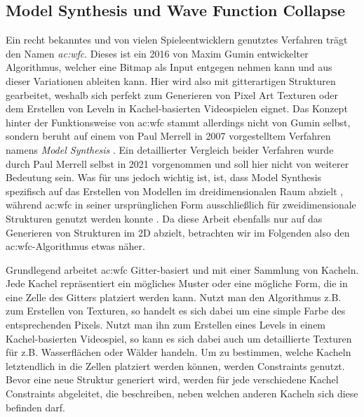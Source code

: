 \subsection{Model Synthesis und Wave Function Collapse}
Ein recht bekanntes und von vielen Spieleentwicklern genutztes Verfahren trägt den Namen \textit{\gls{ac:wfc}}. Dieses ist ein 2016 von
Maxim Gumin entwickelter Algorithmus, welcher eine Bitmap als Input entgegen nehmen kann und aus dieser Variationen ableiten kann. Hier wird also
mit gitterartigen Strukturen gearbeitet, weshalb sich  perfekt zum Generieren von Pixel Art Texturen oder dem Erstellen von
Leveln in Kachel-basierten Videospielen eignet. \cite{45_gumin} Das Konzept hinter der Funktionsweise von \gls{ac:wfc} stammt allerdings
nicht von Gumin selbst, sondern beruht auf einem von Paul Merrell in 2007 vorgestelltem Verfahren namens \textit{Model Synthesis} \cite{20_merrell}.
Ein detaillierter Vergleich beider Verfahren wurde durch Paul Merrell selbst in 2021 vorgenommen \cite{46_merrell} und soll hier nicht von weiterer
Bedeutung sein. Was für uns jedoch wichtig ist, ist, dass Model Synthesis spezifisch auf das Erstellen von Modellen im dreidimensionalen Raum
abzielt \cite{20_merrell}, während \gls{ac:wfc} in seiner ursprünglichen Form ausschließlich für zweidimensionale Strukturen genutzt werden
konnte \cite{45_gumin}\cite{46_merrell}. Da diese Arbeit ebenfalls nur auf das Generieren von Strukturen im 2D abzielt, betrachten wir im Folgenden
also den \gls{ac:wfc}-Algorithmus etwas näher.

Grundlegend arbeitet \gls{ac:wfc} Gitter-basiert und mit einer Sammlung von Kacheln. Jede Kachel repräsentiert ein mögliches Muster oder eine mögliche
Form, die in eine Zelle des Gitters platziert werden kann. Nutzt man den Algorithmus z.B. zum Erstellen von Texturen, so handelt es sich dabei um eine
simple Farbe des entsprechenden Pixels. Nutzt man ihn zum Erstellen eines Levels in einem Kachel-basierten Videospiel, so kann es sich dabei auch um
detaillierte Texturen für z.B. Wasserflächen oder Wälder handeln. Um zu bestimmen, welche Kacheln letztendlich in die Zellen platziert werden können,
werden Constraints genutzt. Bevor eine neue Struktur generiert wird, werden für jede verschiedene Kachel Constraints abgeleitet, die beschreiben, neben
welchen anderen Kacheln sich diese befinden darf. \cite{45_gumin}

